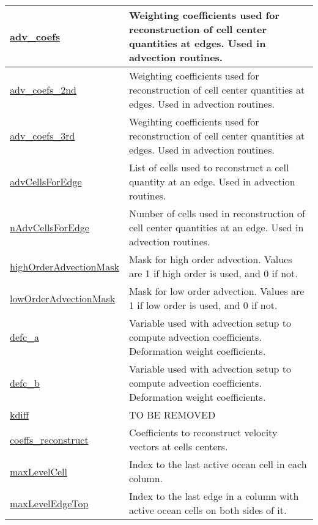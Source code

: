 {\begin{center}
\begin{longtable}{| p{2.0in} | p{4.0in} |}
	\hline
	\hyperref[subsec:var_sec_mesh_adv_coefs]{adv\_coefs} & Weighting coefficients used for reconstruction of cell center quantities at edges. Used in advection routines. \\
	\hline
	\hyperref[subsec:var_sec_mesh_adv_coefs_2nd]{adv\_coefs\_2nd} & Weighting coefficients used for reconstruction of cell center quantities at edges. Used in advection routines. \\
	\hline
	\hyperref[subsec:var_sec_mesh_adv_coefs_3rd]{adv\_coefs\_3rd} & Wegihting coefficients used for reconstruction of cell center quantities at edges. Used in advection routines. \\
	\hline
	\hyperref[subsec:var_sec_mesh_advCellsForEdge]{advCellsForEdge} & List of cells used to reconstruct a cell quantity at an edge. Used in advection routines. \\
	\hline
	\hyperref[subsec:var_sec_mesh_nAdvCellsForEdge]{nAdvCellsForEdge} & Number of cells used in reconstruction of cell center quantities at an edge. Used in advection routines. \\
	\hline
	\hyperref[subsec:var_sec_mesh_highOrderAdvectionMask]{highOrderAdvectionMask} & Mask for high order advection. Values are 1 if high order is used, and 0 if not. \\
	\hline
	\hyperref[subsec:var_sec_mesh_lowOrderAdvectionMask]{lowOrderAdvectionMask} & Mask for low order advection. Values are 1 if low order is used, and 0 if not. \\
	\hline
	\hyperref[subsec:var_sec_mesh_defc_a]{defc\_a} & Variable used with advection setup to compute advection coefficients. Deformation weight coefficients. \\
	\hline
	\hyperref[subsec:var_sec_mesh_defc_b]{defc\_b} & Variable used with advection setup to compute advection coefficients. Deformation weight coefficients. \\
	\hline
	\hyperref[subsec:var_sec_mesh_kdiff]{kdiff} & {\color{red} TO BE REMOVED} \\
	\hline
	\hyperref[subsec:var_sec_mesh_coeffs_reconstruct]{coeffs\_reconstruct} & Coefficients to reconstruct velocity vectors at cells centers. \\
	\hline
	\hyperref[subsec:var_sec_mesh_maxLevelCell]{maxLevelCell} & Index to the last active ocean cell in each column. \\
	\hline
	\hyperref[subsec:var_sec_mesh_maxLevelEdgeTop]{maxLevelEdgeTop} & Index to the last edge in a column with active ocean cells on both sides of it. \\

\end{longtable}
\end{center}}
